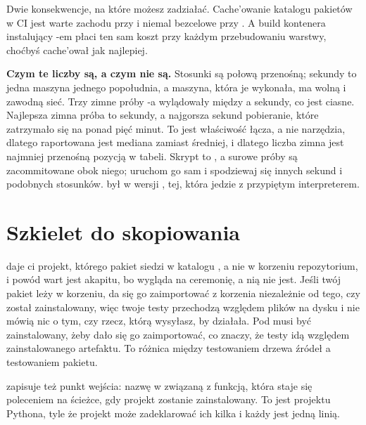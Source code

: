 Dwie konsekwencje, na które możesz zadziałać. Cache'owanie katalogu pakietów w
CI jest warte zachodu przy  i niemal bezcelowe przy . A
build kontenera instalujący -em płaci ten sam koszt przy każdym
przebudowaniu warstwy, choćbyś cache'ował jak najlepiej.

\begin{note}
\textbf{Czym te liczby są, a czym nie są.} Stosunki są połową przenośną;
sekundy to jedna maszyna jednego popołudnia, a maszyna, która je wykonała, ma
wolną i zawodną sieć. Trzy zimne próby -a wylądowały między
 a  sekundy, co jest ciasne.
Najlepsza zimna próba  to  sekundy, a najgorsza
 sekund \dash{} pobieranie, które zatrzymało się na ponad pięć
minut. To jest właściwość łącza, a nie narzędzia, dlatego raportowana jest
mediana zamiast średniej, i dlatego liczba zimna jest najmniej przenośną
pozycją w tabeli. Skrypt to , a surowe próby
są zacommitowane obok niego; uruchom go sam i spodziewaj się innych sekund i
podobnych stosunków.  był w wersji , tej,
która jedzie z przypiętym interpreterem.
\end{note}

\section{Szkielet do skopiowania}
\label{sec:ch02-skeleton}

\noindent
{} daje ci projekt, którego pakiet siedzi w katalogu , a
nie w korzeniu repozytorium, i powód wart jest akapitu, bo wygląda na
ceremonię, a nią nie jest. Jeśli twój pakiet leży w korzeniu, da się go
zaimportować z korzenia niezależnie od tego, czy został zainstalowany, więc
twoje testy przechodzą względem plików na dysku i nie mówią nic o tym, czy
rzecz, którą wysyłasz, by działała. Pod  musi być zainstalowany,
żeby dało się go zaimportować, co znaczy, że testy idą względem
zainstalowanego artefaktu. To różnica między testowaniem drzewa źródeł a
testowaniem pakietu.

 zapisuje też punkt wejścia: nazwę w 
związaną z funkcją, która staje się poleceniem na ścieżce, gdy projekt zostanie
zainstalowany. To jest  projektu Pythona, tyle że projekt
może zadeklarować ich kilka i każdy jest jedną linią.

